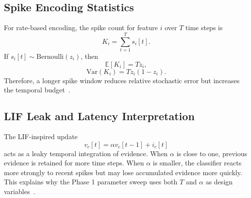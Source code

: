 \documentclass[11pt]{article}
\begin{document}
\subsection{Spike Encoding Statistics}

For rate-based encoding, the spike count for feature $i$ over $T$ time steps is
\begin{equation}
    K_i=\sum_{t=1}^{T}s_i[t].
\end{equation}
If $s_i[t]\sim \mathrm{Bernoulli}(z_i)$, then
\begin{equation}
    \mathbb{E}[K_i]=Tz_i,
\end{equation}
\begin{equation}
    \mathrm{Var}(K_i)=Tz_i(1-z_i).
\end{equation}
Therefore, a longer spike window reduces relative stochastic error but increases the temporal budget~\cite{maass1997networks,gerstner2002spiking}.

\subsection{LIF Leak and Latency Interpretation}

The LIF-inspired update
\begin{equation}
    v_c[t]=\alpha v_c[t-1]+i_c[t]
\end{equation}
acts as a leaky temporal integration of evidence. When $\alpha$ is close to one, previous evidence is retained for more time steps. When $\alpha$ is smaller, the classifier reacts more strongly to recent spikes but may lose accumulated evidence more quickly. This explains why the Phase 1 parameter sweep uses both $T$ and $\alpha$ as design variables~\cite{gerstner2002spiking,roy2019towards}.

\clearpage
{}
{}


\end{document}
